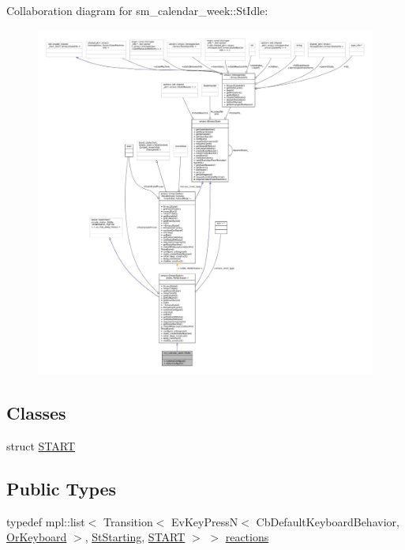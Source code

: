 Collaboration diagram for sm\+\_\+calendar\+\_\+week\+:\+:St\+Idle\+:
\nopagebreak
\begin{figure}[H]
\begin{center}
\leavevmode
\includegraphics[width=350pt]{structsm__calendar__week_1_1StIdle__coll__graph}
\end{center}
\end{figure}
\subsection*{Classes}
\begin{DoxyCompactItemize}
\item 
struct \hyperlink{structsm__calendar__week_1_1StIdle_1_1START}{S\+T\+A\+RT}
\end{DoxyCompactItemize}
\subsection*{Public Types}
\begin{DoxyCompactItemize}
\item 
typedef mpl\+::list$<$ Transition$<$ Ev\+Key\+PressN$<$ Cb\+Default\+Keyboard\+Behavior, \hyperlink{classsm__calendar__week_1_1OrKeyboard}{Or\+Keyboard} $>$, \hyperlink{structsm__calendar__week_1_1StStarting}{St\+Starting}, \hyperlink{structsm__calendar__week_1_1StIdle_1_1START}{S\+T\+A\+RT} $>$ $>$ \hyperlink{structsm__calendar__week_1_1StIdle_a78b36c84601f8d7da2db72f2f3cba544}{reactions}
\end{DoxyCompactItemize}
